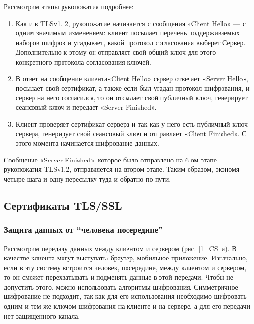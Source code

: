 Рассмотрим этапы рукопожатия подробнее:
\begin{enumerate}
	\item Как и в TLSv1. 2, рукопожатие начинается с сообщения «Client Hello» — с одним значимым изменением: клиент посылает перечень поддерживаемых наборов шифров и угадывает, какой протокол согласования выберет Сервер. Дополнительно к этому он отправляет свой общий ключ для этого конкретного протокола согласования ключей.
	\item В ответ на сообщение клиента«Client Hello» сервер отвечает «Server Hello», посылает свой сертификат, а также если был угадан протокол шифрования, и сервер на него согласился, то он отсылает свой публичный ключ, генерирует сеансовый ключ и передает «Server Finished».
	\item Клиент проверяет сертификат сервера и так как у него есть публичный ключ сервера, генерирует свой сеансовый ключ и отправляет «Client Finished». С этого момента начинается шифрование данных.
\end{enumerate}
Сообщение «Server Finished», которое было отправлено на 6-ом этапе рукопожатия TLSv1.2, отправляется на втором этапе. Таким образом, экономя четыре шага и одну пересылку туда и обратно по пути.
\newpage

\subsection{Сертификаты TLS/SSL}
\subsubsection{Защита данных от ``человека посередине''}
Рассмотрим передачу данных между клиентом и сервером (рис. \ref{1_CS} а). В качестве клиента могут выступать: браузер, мобильное приложение.
Изначально, если в эту систему встроится человек, посередине, между клиентом и сервером, то он сможет перехватывать и подменять данные в этой передачи. Чтобы не допустить этого, можно использовать алгоритмы шифрования. 
Симметричное шифрование не подходит, так как для его использования необходимо шифровать одним и тем же ключом шифрования на клиенте и на сервере, а для его передачи нет защищенного канала.


